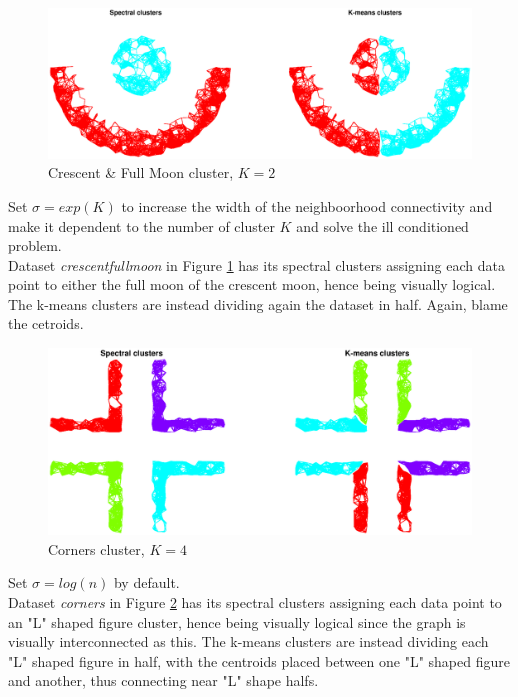 \documentclass[unicode,11pt,a4paper,oneside,numbers=endperiod,openany]{scrartcl}
\begin{document}
\begin{figure}[H]
    \centering
    \caption{Crescent \& Full Moon cluster, $K=2$}
    \label{fig:ex1-7-crescentfullmoon}
    \includegraphics[width=\textwidth, trim={3cm 2cm 3cm 0cm}]{./img/ex1-7-crescentfullmoon.eps}
\end{figure}

Set $\sigma=exp(K)$ to increase the width of the neighboorhood connectivity and
make it dependent to the number of cluster $K$ and solve the ill conditioned problem.\\
Dataset \textit{crescentfullmoon} in Figure \ref{fig:ex1-7-crescentfullmoon} has its spectral clusters
assigning each data point to either the full moon of the crescent moon, hence being visually logical.
The k-means clusters are instead dividing again the dataset in half.
Again, blame the cetroids.

\begin{figure}[H]
    \centering
    \caption{Corners cluster, $K=4$}
    \label{fig:ex1-7-corners}
    \includegraphics[width=\textwidth, trim={3cm 1cm 3cm 0cm}]{./img/ex1-7-corners.eps}
\end{figure}

Set $\sigma=log(n)$ by default.\\
Dataset \textit{corners} in Figure \ref{fig:ex1-7-corners} has its spectral clusters
assigning each data point to an "L" shaped figure cluster, hence being visually logical since the graph
is visually interconnected as this.
The k-means clusters are instead dividing each "L" shaped figure in half, with the centroids
placed between one "L" shaped figure and another, thus connecting near "L" shape halfs.
\end{document}
